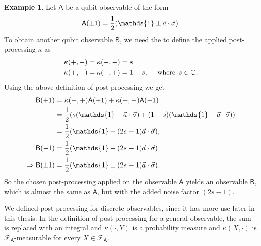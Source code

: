 \documentclass[a4paper,12pt]{wihuri}
\theoremstyle{definition}
\newtheorem{example}{Example}
\numberwithin{definition}{section}
\numberwithin{example}{section}
\numberwithin{theorem}{section}
\numberwithin{proposition}{section}
\numberwithin{lemma}{section}
\newcommand{\salg}{\mathcal{F}}%
\newcommand{\A}{\mathsf{A}}%
\newcommand{\B}{\mathsf{B}}%
\newcommand{\id}{\mathds{1}}
\begin{document}
\begin{example}
Let $\A$ be a qubit observable of the form
\begin{align*}
\A(\pm 1) = \dfrac{1}{2}(\id \pm \vec{a}\cdot\vec{\sigma})\text. 
\end{align*}
To obtain another qubit observable $\B$, we need the to define the applied post-processing $\kappa$ as
\begin{align*}
\kappa(+,+) = \kappa(-,-) &= s \\
\kappa(+,-) = \kappa(-,+) &= 1-s,\quad\text{ where }\,s\in \mathbb{C}\text.
\end{align*}
Using the above definition of post processing we get
\begin{align*}
\B(+1) &= \kappa(+,+)\A(+1) + \kappa(+,-)\A(-1) \\
&=\frac{1}{2}(s(\id + \vec{a}\cdot\vec{\sigma}) + (1-s)(\id - \vec{a}\cdot\vec{\sigma}))\\
&=\frac{1}{2}(\id + (2s-1)\vec{a}\cdot\vec{\sigma}),\\
\B(-1) &= \dfrac{1}{2}(\id - (2s-1)\vec{a}\cdot\vec{\sigma})\\
\Rightarrow \B(\pm 1) &= \frac{1}{2}(\id \pm (2s-1)\vec{a}\cdot\vec{\sigma})\text.
\end{align*}
So the chosen post-processing applied on the observable $\A$ yields an observable $\B$, which is almost the same as $\A$, but with the added noise factor $(2s-1)$. 


\end{example}

We defined post-processing for discrete observables, since it has more use later in this thesis. In the definition of post processing for a general observable, the sum is replaced with an integral and $\kappa(\cdot, Y)$ is a probability measure and $\kappa(X, \cdot)$ is $\salg_\A$-measurable for every $X\in\salg_\A$.


\end{document}

